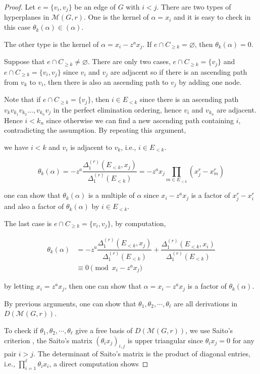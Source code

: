 \documentclass[12pt]{article}
\theoremstyle{plain}%
\theoremstyle{definition}
\begin{document}
\begin{proof}
    Let $e=\{v_i,v_j\}$ be an edge of $G$ with $i < j$. There are two types of hyperplanes in $\mathcal{M}(G,r)$. One is the kernel of $\alpha=x_i$ and it is easy to check in this case $\theta_k(\alpha)\in(\alpha)$. 

The other type is the kernel of $\alpha = x_i - z^ax_j$. If $e \cap C_{\geq k} = \varnothing$, then $\theta_{k}(\alpha) = 0$. 

Suppose that $e \cap C_{\geq k} \neq \varnothing$. There are only two cases, $e \cap C_{\geq k} =\{v_j\}$ and $e \cap C_{\geq k} =\{v_i,v_j\}$ since $v_i$ and $v_j$ are adjacent so if there is an ascending path from $v_k$ to $v_i$, then there is also an ascending path to $v_j$ by adding one node.

Note that if $e \cap C_{\geq k} =\{v_j\}$, then $i\in E_{<k}$ since there is an ascending path $v_kv_{k_1}v_{k_2}\dots,v_{k_n}v_j$ in the perfect elimination ordering, hence $v_i$ and $v_{k_n}$ are adjacent. Hence $i<k_n$ since otherwise we can find a new ascending path containing $i$, contradicting the assumption. By repeating this argument, 

we have $i<k$ and $v_i$ is adjacent to $v_k$, i.e., $i\in E_{<k}$. 


$$\theta_{k}(\alpha) = -z^a\dfrac{\Delta^{(r)}_1(E_{<k}, x_{j})}{\Delta^{(r)}_1(E_{<k})} = -z^ax_j \prod_{m\in E_{<k}}(x_j^{r}-x_m^{r})$$

one can show that $\theta_{k}(\alpha)$ is a multiple of $\alpha$ since  $x_i-z^ax_j$ is a factor of $x_j^{r}-x_i^{r}$ and also a factor of $\theta_{k}(\alpha)$ by $i\in E_{<k}$.

The last case is $e \cap C_{\geq k} =\{v_i,v_j\}$, by computation,

\begin{align*}
    \theta_{k}(\alpha) &= -z^a\dfrac{\Delta^{(r)}_1(E_{<k}, x_{j})}{\Delta^{(r)}_1(E_{<k})}+\dfrac{\Delta^{(r)}_1(E_{<k}, x_{i})}{\Delta^{(r)}_1(E_{<k})}\\
    & \equiv 0 \pmod {x_i-z^ax_j}
\end{align*}

by letting $x_i=z^ax_j$, then one can show that $\alpha=x_i-z^ax_j$ is a factor of $\theta_k(\alpha)$.

By previous arguments, one can show that $\theta_1, \theta_2,\cdots,\theta_\ell$ are all derivations in $D(\mathcal{M}(G,r))$.

To check if $\theta_1, \theta_2,\cdots,\theta_\ell$ give a free basis of $D(\mathcal{M}(G,r))$, we use Saito's criterion \cite{saito1980theory}, the Saito's matrix $(\theta_i x_j)_{i,j}$ is upper triangular since $\theta_i x_j=0$ for any pair $i>j$. The determinant of Saito's matrix is the product of diagonal entries, i.e., $\prod_{i=1}^\ell \theta_i x_i$, a direct computation shows


\end{proof}
\end{document}
